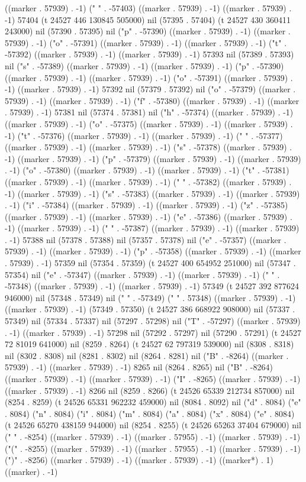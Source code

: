 ((marker . 57939) . -1) (" " . -57403) ((marker . 57939) . -1) ((marker . 57939) . -1) 57404 (t 24527 446 130845 505000) nil (57395 . 57404) (t 24527 430 360411 243000) nil (57390 . 57395) nil ("p" . -57390) ((marker . 57939) . -1) ((marker . 57939) . -1) ("o" . -57391) ((marker . 57939) . -1) ((marker . 57939) . -1) ("t" . -57392) ((marker . 57939) . -1) ((marker . 57939) . -1) 57393 nil (57389 . 57393) nil ("s" . -57389) ((marker . 57939) . -1) ((marker . 57939) . -1) ("p" . -57390) ((marker . 57939) . -1) ((marker . 57939) . -1) ("o" . -57391) ((marker . 57939) . -1) ((marker . 57939) . -1) 57392 nil (57379 . 57392) nil ("o" . -57379) ((marker . 57939) . -1) ((marker . 57939) . -1) ("f" . -57380) ((marker . 57939) . -1) ((marker . 57939) . -1) 57381 nil (57374 . 57381) nil ("h" . -57374) ((marker . 57939) . -1) ((marker . 57939) . -1) ("o" . -57375) ((marker . 57939) . -1) ((marker . 57939) . -1) ("t" . -57376) ((marker . 57939) . -1) ((marker . 57939) . -1) (" " . -57377) ((marker . 57939) . -1) ((marker . 57939) . -1) ("s" . -57378) ((marker . 57939) . -1) ((marker . 57939) . -1) ("p" . -57379) ((marker . 57939) . -1) ((marker . 57939) . -1) ("o" . -57380) ((marker . 57939) . -1) ((marker . 57939) . -1) ("t" . -57381) ((marker . 57939) . -1) ((marker . 57939) . -1) (" " . -57382) ((marker . 57939) . -1) ((marker . 57939) . -1) ("s" . -57383) ((marker . 57939) . -1) ((marker . 57939) . -1) ("i" . -57384) ((marker . 57939) . -1) ((marker . 57939) . -1) ("z" . -57385) ((marker . 57939) . -1) ((marker . 57939) . -1) ("e" . -57386) ((marker . 57939) . -1) ((marker . 57939) . -1) (" " . -57387) ((marker . 57939) . -1) ((marker . 57939) . -1) 57388 nil (57378 . 57388) nil (57357 . 57378) nil ("e" . -57357) ((marker . 57939) . -1) ((marker . 57939) . -1) ("p" . -57358) ((marker . 57939) . -1) ((marker . 57939) . -1) 57359 nil (57354 . 57359) (t 24527 400 654952 251000) nil (57347 . 57354) nil ("e" . -57347) ((marker . 57939) . -1) ((marker . 57939) . -1) (" " . -57348) ((marker . 57939) . -1) ((marker . 57939) . -1) 57349 (t 24527 392 877624 946000) nil (57348 . 57349) nil (" " . -57349) (" " . 57348) ((marker . 57939) . -1) ((marker . 57939) . -1) (57349 . 57350) (t 24527 386 668922 908000) nil (57337 . 57349) nil (57334 . 57337) nil (57297 . 57298) nil ("T" . -57297) ((marker . 57939) . -1) ((marker . 57939) . -1) 57298 nil (57292 . 57297) nil (57290 . 57291) (t 24527 72 81019 641000) nil (8259 . 8264) (t 24527 62 797319 539000) nil (8308 . 8318) nil (8302 . 8308) nil (8281 . 8302) nil (8264 . 8281) nil ("B" . -8264) ((marker . 57939) . -1) ((marker . 57939) . -1) 8265 nil (8264 . 8265) nil ("B" . -8264) ((marker . 57939) . -1) ((marker . 57939) . -1) ("I" . -8265) ((marker . 57939) . -1) ((marker . 57939) . -1) 8266 nil (8259 . 8266) (t 24526 65339 212734 857000) nil (8254 . 8259) (t 24526 65331 962232 459000) nil (8084 . 8092) nil ("d" . 8084) ("e" . 8084) ("n" . 8084) ("i" . 8084) ("m" . 8084) ("a" . 8084) ("x" . 8084) ("e" . 8084) (t 24526 65270 438159 944000) nil (8254 . 8255) (t 24526 65263 37404 679000) nil (" " . -8254) ((marker . 57939) . -1) ((marker . 57955) . -1) ((marker . 57939) . -1) ("(" . -8255) ((marker . 57939) . -1) ((marker . 57955) . -1) ((marker . 57939) . -1) (")" . -8256) ((marker . 57939) . -1) ((marker . 57939) . -1) ((marker*) . 1) ((marker) . -1) 